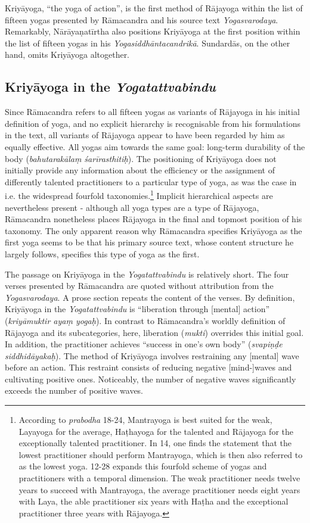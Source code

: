 Kriyāyoga, ``the yoga of action'', is the first method of Rājayoga within the list of fifteen yogas presented by Rāmacandra and his source text \textit{Yogasvarodaya}. Remarkably, Nārāyaṇatīrtha also positions Kriyāyoga at the first position within the list of fifteen yogas in his \textit{Yogasiddhāntacandrikā}. Sundardās, on the other hand, omits Kriyāyoga altogether. 

\subsection{Kriyāyoga in the \textit{Yogatattvabindu}}
\label{kriyaintro}
Since Rāmacandra refers to all fifteen yogas as variants of Rājayoga in his initial definition of yoga, and no explicit hierarchy is recognisable from his formulations in the text, all variants of Rājayoga appear to have been regarded by him as equally effective. All yogas aim towards the same goal: long-term durability of the body (\textit{bahutarakālaṃ śarīrasthitiḥ}). The positioning of Kriyāyoga does not initially provide any information about the efficiency or the assignment of differently talented practitioners to a particular type of yoga, as was the case in i.e. the widespread fourfold taxonomies.\footnote{According to \textit{prabodha} 18-24, Mantrayoga is best suited for the weak, Layayoga for the average, Haṭhayoga for the talented and Rājayoga for the exceptionally talented practitioner. In  14, one finds the statement that the lowest practitioner should perform Mantrayoga, which is then also referred to as the lowest yoga.  12-28 expands this fourfold scheme of yogas and practitioners with a temporal dimension. The weak practitioner needs twelve years to succeed with Mantrayoga, the average practitioner needs eight years with Laya, the able practitioner six years with Haṭha and the exceptional practitioner three years with Rājayoga.} Implicit hierarchical aspects are nevertheless present - although all yoga types are a type of Rājayoga, Rāmacandra nonetheless places Rājayoga in the final and topmost position of his taxonomy.
The only apparent reason why Rāmacandra specifies Kriyāyoga as the first yoga seems to be that his primary source text, whose content structure he largely follows, specifies this type of yoga as the first.

The passage on Kriyāyoga in the \textit{Yogatattvabindu} is relatively short. The four verses presented by Rāmacandra are quoted without attribution from the \textit{Yogasvarodaya}. A prose section repeats the content of the verses. By definition, Kriyāyoga in the \textit{Yogatattvabindu} is ``liberation through [mental] action'' (\textit{kriyāmuktir ayaṃ yogaḥ}). In contrast to Rāmacandra's worldly definition of Rājayoga and its subcategories, here, liberation (\textit{mukti}) overrides this initial goal. In addition, the practitioner achieves ``success in one's own body'' (\textit{svapiṇḍe siddhidāyakaḥ}). The method of Kriyāyoga involves restraining any [mental] wave before an action. This restraint consists of reducing negative [mind-]waves and cultivating positive ones. Noticeably, the number of negative waves significantly exceeds the number of positive waves.

